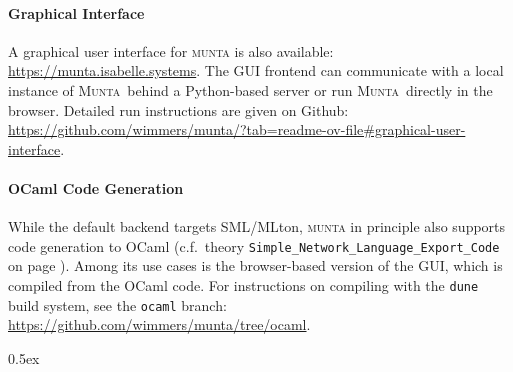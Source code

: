 \documentclass[10pt,a4paper]{article}
\newcommand{\munta}{\textsc{Munta}}
\begin{document}
\paragraph{Graphical Interface} 
A graphical user interface for \textsc{munta} is also available:
\url{https://munta.isabelle.systems}.
The GUI frontend can communicate with a local instance of \munta\ behind a Python-based server
or run \munta\ directly in the browser.
Detailed run instructions are given on Github:
\url{https://github.com/wimmers/munta/?tab=readme-ov-file#graphical-user-interface}.

\paragraph{OCaml Code Generation} 
While the default backend targets SML/MLton,
\textsc{munta} in principle also supports code generation to OCaml
(c.f.\ theory \texttt{Simple\_Network\_Language\_Export\_Code} on page \pageref{export-ocaml}).
Among its use cases is the browser-based version of the GUI, which is compiled from the OCaml code.
For instructions on compiling with the \texttt{dune} build system, see the \texttt{ocaml} branch:
\url{https://github.com/wimmers/munta/tree/ocaml}.

\newpage

\parindent 0pt\parskip 0.5ex





\end{document}
